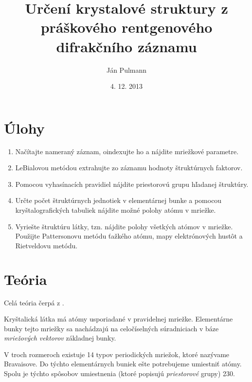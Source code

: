 \documentclass[a4paper, 10pt]{article}
\begin{document}
\title{Určení krystalové struktury z práškového rentgenového difrakčního záznamu}
\author{Ján Pulmann}
\date{4. 12. 2013}
\maketitle
\section*{Úlohy}
\begin{enumerate}

	\item Načítajte nameraný záznam, oindexujte ho a nájdite mriežkové parametre.
    \item LeBialovou metódou extrahujte zo záznamu hodnoty štruktúrnych faktorov.
    \item Pomocou vyhasínacích pravidiel nájdite priestorovú grupu hľadanej štruktúry.
    \item Určte počet štruktúrnych jednotiek v elementárnej bunke a pomocou kryštalografických tabuliek nájdite možné polohy atómu v mriežke.
    \item Vyriešte štruktúru látky, tzn. nájdite polohy všetkých atómov v mriežke. Použijte Pattersonovu metódu ťažkého atómu, mapy elektrónových hustôt a Rietveldovu metódu.
    
\end{enumerate}
\section*{Teória}

Celá teória čerpá z \cite{stud}.

Kryštalická látka má atómy usporiadané v pravidelnej mriežke. Elementárne bunky tejto mriežky sa nachádzajú na celočíselných súradniciach v báze \textit{mriežových vektorov} základnej bunky.

V troch rozmeroch existuje 14 typov periodických mriežok, ktoré nazývame Bravaisove. Do týchto elementárnych buniek ešte potrebujeme umiestniť atómy. Spolu je týchto spôsobov umiestnenia (ktoré popisujú \textit{priestorové} grupy) 230.
\end{document}
